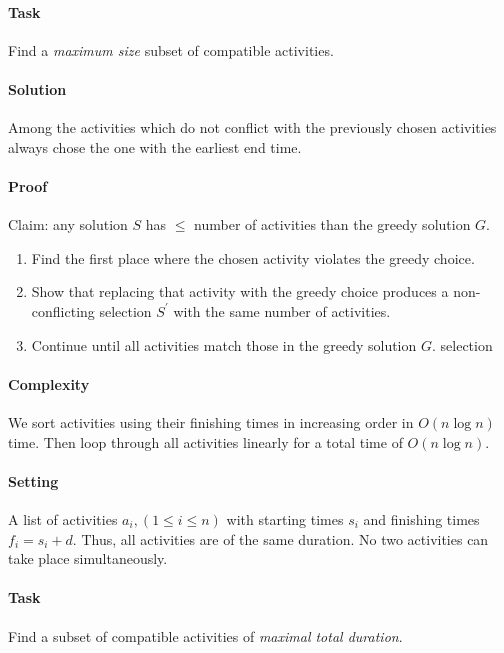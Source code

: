 \paragraph{Task} 
Find a \textit{maximum size} subset of compatible activities.

\paragraph{Solution} 
Among the activities which do not conflict with the previously chosen activities always chose
the one with the earliest end time.

\paragraph{Proof} 
Claim: any solution \(S\) has \(\leq\) number of activities than the greedy solution \(G\).
\begin{enumerate}
    \item Find the first place where the chosen activity violates the greedy choice.
    \item Show that replacing that activity with the greedy choice produces a non-conflicting 
    selection \(S^\prime\) with the same number of activities. 
    \item Continue until all activities match those in the greedy solution \(G\).
    selection
\end{enumerate}

\paragraph{Complexity} 
We sort activities using their finishing times in increasing order in \(O(n\log n)\) time.
Then loop through all activities linearly for a total time of \(O(n\log n)\).

\paragraph{Setting} A list of activities \(a_i, (1 \leq i \leq n)\) with starting times \(s_i\)
and finishing times \(f_i = s_i + d\). Thus, all activities are of  the same duration. No two
activities can take place simultaneously.

\paragraph{Task} Find a subset of compatible activities of \textit{maximal total duration}.

